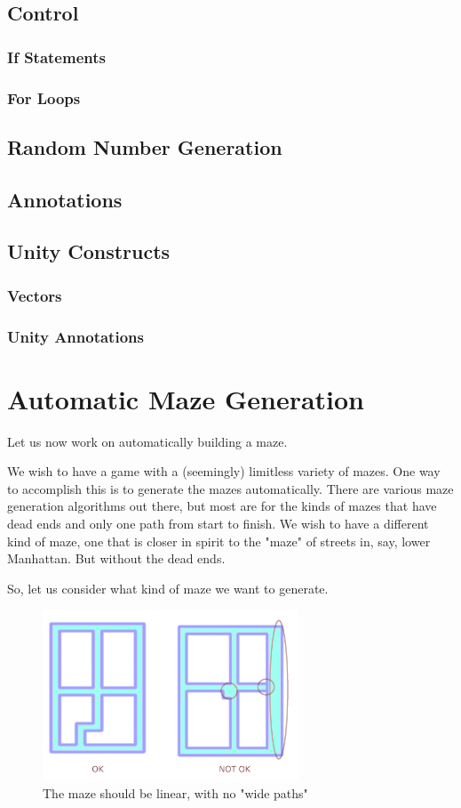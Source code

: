 \documentclass[12pt]{amsbook}
\theoremstyle{definition}
\theoremstyle{remark}
\numberwithin{figure}{chapter}
\numberwithin{table}{chapter}
\numberwithin{section}{chapter}
\numberwithin{equation}{section}
\begin{document}
\section{Control}
\subsection{If Statements}
\subsection{For Loops}

\section{Random Number Generation}

\section{Annotations}

\section{Unity Constructs}
\subsection{Vectors}
\subsection{Unity Annotations}


\chapter{Automatic Maze Generation}

Let us now work on automatically building a maze.

We wish to have a game with a (seemingly) limitless variety of mazes.  One way to accomplish this is to generate the mazes automatically.  There are various maze generation algorithms out there, but most are for the kinds of mazes that have dead ends and only one path from start to finish.  We wish to have a different kind of maze, one that is closer in spirit to the "maze" of streets in, say, lower Manhattan.  But without the dead ends.

So, let us consider what kind of maze we want to generate.

\begin{figure}[h]
  \includegraphics[width=3in]{Linear.png}
  \caption{The maze should be linear, with no "wide paths"}
  \label{fig:linear}
\end{figure}
  
\end{document}
